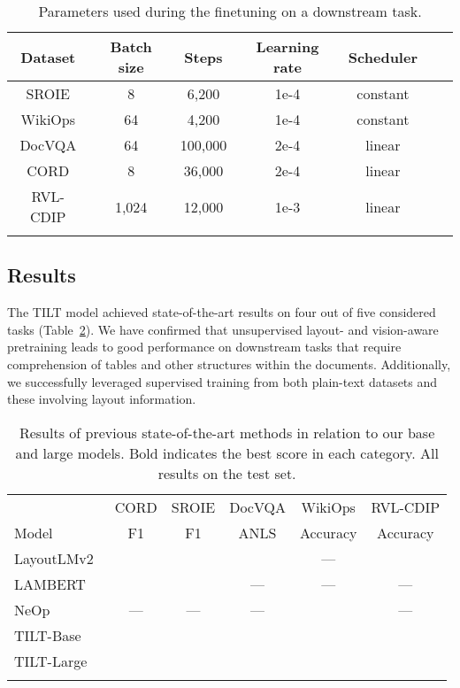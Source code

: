 \documentclass[runningheads]{llncs}
\begin{document}
\begin{table}
    \setlength{\tabcolsep}{5pt}
    \centering
    \begin{tabular}{*7c}
        \toprule
        Dataset & Batch size & Steps & Learning rate & Scheduler \\
        \midrule
        SROIE & 8 & 6,200 & 1e-4 & constant  \\
        WikiOps & 64 & 4,200 & 1e-4 & constant  \\
        DocVQA & 64 & 100,000 & 2e-4 & linear  \\
        CORD & 8 & 36,000 & 2e-4 & linear  \\
        RVL-CDIP & 1,024 & 12,000 & 1e-3 & linear  \\
        \bottomrule  \\
    \end{tabular} 
    \caption{Parameters used during the finetuning on a downstream task. \label{tab:finetune-params}}
\end{table}

\subsection{Results}

The TILT model achieved state-of-the-art results on four out of five considered tasks (Table~\ref{tab:results}).
We have confirmed that unsupervised layout- and vision-aware pretraining leads to good performance on downstream tasks that require comprehension of tables and other structures within the documents. Additionally, we successfully leveraged supervised training from both plain-text datasets and these involving layout information.

\begin{table}[t!]
    \setlength{\tabcolsep}{7pt}
    \centering
    \begin{tabular}{lccccc}
        \toprule
         &
        CORD &
        SROIE &
        DocVQA &
        WikiOps &
        RVL-CDIP \\
        Model & F1 & F1 & ANLS & Accuracy & Accuracy \\
        \midrule
         LayoutLMv2~\cite{xu2020layoutlmv2} &  &  &  & --- &  \\
        LAMBERT \cite{garncarek2020lambert} &  &  & --- & --- & ---\\
        NeOp \cite{Cho2018AdversarialTA} & --- & --- & --- &  & ---
        \vspace{0mm} \\
        TILT-Base &  &  &  &  &  \\
        TILT-Large &  &  &  &  &  \\
        \bottomrule \\
    \end{tabular}
    \caption{Results of previous state-of-the-art methods in relation to our base and large models. Bold indicates the best score in each category. All results on the test set.\label{tab:results}}
\end{table}
\end{document}
